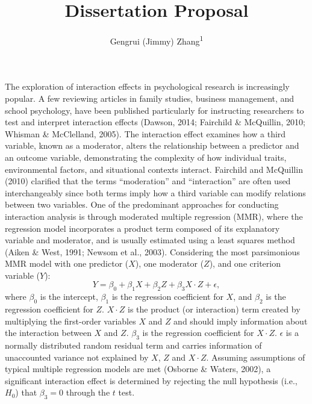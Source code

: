 \documentclass[
  man]{apa6}
\title{Dissertation Proposal}
\author{Gengrui (Jimmy) Zhang\textsuperscript{1}}
\date{}
\affiliation{\vspace{0.5cm}\textsuperscript{1} University of Southhern California}
\begin{document}
\maketitle

The exploration of interaction effects in psychological research is increasingly popular. A few reviewing articles in family studies, business management, and school psychology, have been published particularly for instructing researchers to test and interpret interaction effects (Dawson, 2014; Fairchild \& McQuillin, 2010; Whisman \& McClelland, 2005). The interaction effect examines how a third variable, known as a moderator, alters the relationship between a predictor and an outcome variable, demonstrating the complexity of how individual traits, environmental factors, and situational contexts interact. Fairchild and McQuillin (2010) clarified that the terms ``moderation'' and ``interaction'' are often used interchangeably since both terms imply how a third variable can modify relations between two variables. One of the predominant approaches for conducting interaction analysis is through moderated multiple regression (MMR), where the regression model incorporates a product term composed of its explanatory variable and moderator, and is usually estimated using a least squares method (Aiken \& West, 1991; Newsom et al., 2003). Considering the most parsimonious MMR model with one predictor (\(X\)), one moderator (\(Z\)), and one criterion variable (\(Y\)):
\begin{equation}
Y = \beta_{0} + \beta_{1}X + \beta_{2}Z + \beta_{3}X \cdot Z + \epsilon,
\end{equation}
where \(\beta_{0}\) is the intercept, \(\beta_{1}\) is the regression coefficient for \(X\), and \(\beta_{2}\) is the regression coefficient for \(Z\). \(X \cdot Z\) is the product (or interaction) term created by multiplying the first-order variables \(X\) and \(Z\) and should imply information about the interaction between \(X\) and \(Z\). \(\beta_{3}\) is the regression coefficient for \(X \cdot Z\). \(\epsilon\) is a normally distributed random residual term and carries information of unaccounted variance not explained by \(X\), \(Z\) and \(X \cdot Z\). Assuming assumptions of typical multiple regression models are met (Osborne \& Waters, 2002), a significant interaction effect is determined by rejecting the null hypothesis (i.e., \(H_{0}\)) that \(\beta_{3} = 0\) through the \(t\) test.
\end{document}
